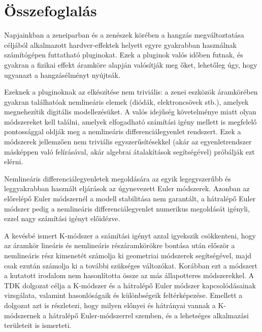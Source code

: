 \setcounter{page}{1}

\selecthungarian

\chapter*{Összefoglalás}

Napjainkban a zeneiparban és a zenészek körében a hangzás megváltoztatása céljából alkalmazott hardver-effektek helyett egyre gyakrabban használnak számítógépen futtatható pluginokat. Ezek a pluginok valós időben futnak, és gyakran a fizikai effekt áramköre alapján valósítják meg őket, lehetőleg úgy, hogy ugyanazt a hangzásélményt nyújtsák.

Ezeknek a pluginoknak az elkészítése nem triviális: a zenei eszközök áramkörében gyakran találhatóak nemlineáris elemek (diódák, elektroncsövek stb.), amelyek megnehezítik digitális modellezésüket. A valós idejűség követelménye miatt olyan módszereket kell találni, amelyek elfogadható számítási igény mellett is megfelelő pontossággal oldják meg a nemlineáris differenciálegyenlet rendszert. Ezek a módszerek jellemzően nem triviális egyszerűsítésekkel (akár az egyenletrendszer másképpen való felírásával, akár algebrai átalakítások segítségével) próbálják ezt elérni.

Nemlineáris differenciálegyenletek megoldására az egyik legegyszerűbb és leggyakrabban használt eljárások az úgynevezett Euler módszerek. Azonban az előrelépő Euler módszernél a modell stabilitása nem garantált, a hátralépő Euler módszer pedig a nemlineáris differenciálegyenlet numerikus megoldását igényli, ezzel nagy számítási igényt előidézve.

A kevésbé ismert K-módszer a számítási igényt azzal igyekszik csökkenteni, hogy az áramkör lineáris és nemlineáris részáramkörökre bontása után először a nemlineáris rész kimenetét számolja ki geometriai módszerek segítségével, majd csak ezután számolja ki a további szükséges változókat. Korábban ezt a módszert a kutatott irodalom nem hasonlította össze az más állapotteres módszerekkel. A TDK dolgozat célja a K-módszer és a hátralépő Euler módszer kapcsolódásainak vizsgálata, valamint hasonlóságaik és különbségeik feltérképezése. Emellett a dolgozat azt is részletezi, hogy milyen előnyei és hátrányai vannak a K-módszernek a hátralépő Euler-módszerrel szemben, és a lehetséges alkalmazási területeit is ismerteti.

